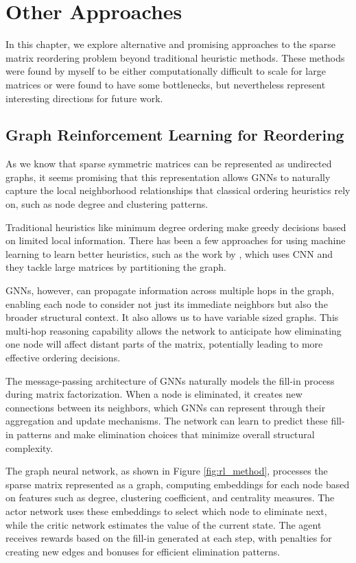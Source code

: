 \chapter{Other Approaches}
\label{ch:other_approaches}

In this chapter, we explore alternative and promising approaches to the sparse matrix reordering problem beyond traditional heuristic methods. These methods were found by myself to be either computationally difficult to scale for large matrices or were found to have some bottlenecks, but nevertheless represent interesting directions for future work. 

\section{Graph Reinforcement Learning for Reordering}

As we know that sparse symmetric matrices can be represented as undirected graphs, it seems promising that this representation allows GNNs to naturally capture the local neighborhood relationships that classical ordering heuristics rely on, such as node degree and clustering patterns.

Traditional heuristics like minimum degree ordering make greedy decisions based on limited local information. There has been a few approaches for using machine learning to learn better heuristics, such as the work by \cite{dasgupta_alpha_2023}, which uses CNN and they tackle large matrices by partitioning the graph. 

GNNs, however, can propagate information across multiple hops in the graph, enabling each node to consider not just its immediate neighbors but also the broader structural context. It also allows us to have variable sized graphs. This multi-hop reasoning capability allows the network to anticipate how eliminating one node will affect distant parts of the matrix, potentially leading to more effective ordering decisions.

The message-passing architecture of GNNs naturally models the fill-in process during matrix factorization. When a node is eliminated, it creates new connections between its neighbors, which GNNs can represent through their aggregation and update mechanisms. The network can learn to predict these fill-in patterns and make elimination choices that minimize overall structural complexity.

The graph neural network, as shown in Figure \ref{fig:rl_method}, processes the sparse matrix represented as a graph, computing embeddings for each node based on features such as degree, clustering coefficient, and centrality measures. The actor network uses these embeddings to select which node to eliminate next, while the critic network estimates the value of the current state. The agent receives rewards based on the fill-in generated at each step, with penalties for creating new edges and bonuses for efficient elimination patterns.

